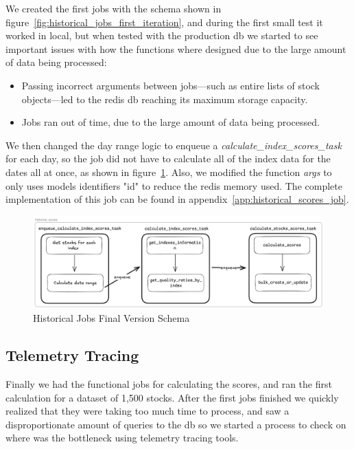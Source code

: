 \documentclass[11pt,english,a4paper,hidelinks]{book}
\begin{document}
\noindent We created the first jobs with the schema shown in figure~\ref{fig:historical_jobs_first_iteration}, and during the first small test it worked in local, but when tested with the production \acrshort{db} we started to see important issues with how the functions where designed due to the large amount of data being processed:
\begin{itemize}
    \item Passing incorrect arguments between jobs—such as entire lists of stock objects—led to the \acrshort{redis} \acrshort{db} reaching its maximum storage capacity.
    \item Jobs ran out of time, due to the large amount of data being processed.
\end{itemize}

\noindent We then changed the day range logic to enqueue a \textit{calculate\_index\_scores\_task} for each day, so the job did not have to calculate all of the index data for the dates all at once, as shown in figure~\ref{fig:historical_jobs_final_version}. Also, we modified the function \textit{args} to only uses models identifiers "id" to reduce the \acrshort{redis} memory used. The complete implementation of this job can be found in appendix~\ref{app:historical_scores_job}.

\begin{figure}[H]
    \centering
    \includegraphics[width=1\textwidth]{images/tweenvest/Historical Jobs Final Version.png}
    \caption{Historical Jobs Final Version Schema}
    \label{fig:historical_jobs_final_version}
\end{figure}



\subsection{Telemetry Tracing}
Finally we had the functional jobs for calculating the scores, and ran the first calculation for a dataset of 1,500 stocks. After the first jobs finished we quickly realized that they were taking too much time to process, and saw a disproportionate amount of queries to the \acrshort{db} so we started a process to check on where was the bottleneck using telemetry tracing tools.
\end{document}
